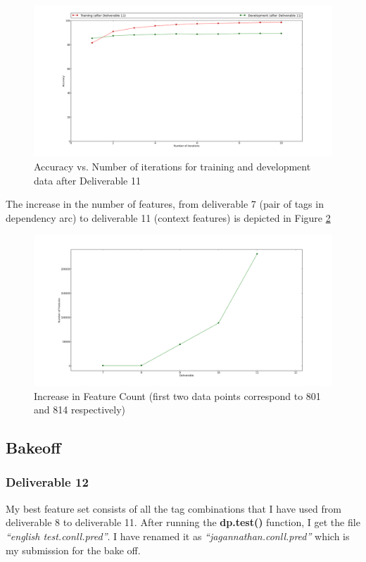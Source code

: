 \documentclass[10pt, letter]{article}
\begin{document}
\begin{figure}[h!]
  \centering
    \includegraphics[scale = 0.25]{Images/deliverable11}
    \caption{Accuracy vs. Number of iterations for training and development data after Deliverable 11}
  \label{deli11}
\end{figure}

The increase in the number of features, from deliverable 7 (pair of tags in dependency arc) to deliverable 11 (context features) is depicted in Figure \ref{fig}

\begin{figure}[h!]
  \centering
    \includegraphics[scale = 0.25]{Images/fig}
    \caption{Increase in Feature Count (first two data points correspond to 801 and 814 respectively)}
  \label{fig}
\end{figure}


\subsection{Bakeoff}
\subsubsection*{Deliverable 12}
My best feature set consists of all the tag combinations that I have used from deliverable 8 to deliverable 11. After running the \textbf{dp.test()} function, I get the file \textit{``english test.conll.pred''}. I have renamed it as \textit{``jagannathan.conll.pred''} which is my submission for the bake off.
\end{document}
